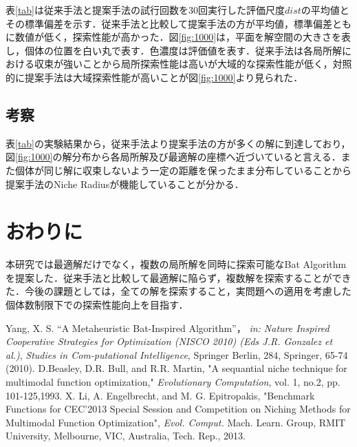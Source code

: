 \documentclass[twocolumn, a4paper]{UECIEresume}
\begin{document}
表\ref{tab}は従来手法と提案手法の試行回数を30回実行した評価尺度$dist$の平均値とその標準偏差を示す．従来手法と比較して提案手法の方が平均値，標準偏差ともに数値が低く，探索性能が高かった．図\ref{fig:1000}は，平面を解空間の大きさを表し，個体の位置を白い丸で表す．色濃度は評価値を表す．従来手法は各局所解における収束が強いことから局所探索性能は高いが大域的な探索性能が低く，対照的に提案手法は大域探索性能が高いことが図\ref{fig:1000}より見られた．

\subsection{考察}
表\ref{tab}の実験結果から，従来手法より提案手法の方が多くの解に到達しており，図\ref{fig:1000}の解分布から各局所解及び最適解の座標へ近づいていると言える．また個体が同じ解に収束しないよう一定の距離を保ったまま分布していることから提案手法のNiche Radiusが機能していることが分かる．
\section{おわりに}
本研究では最適解だけでなく，複数の局所解を同時に探索可能なBat Algorithmを提案した．従来手法と比較して最適解に陥らず，複数解を探索することができた．今後の課題としては，全ての解を探索すること，実問題への適用を考慮した個体数制限下での探索性能向上を目指す．
{\small
\begin{thebibliography}{*}
 Yang, X. S. “A Metaheuristic Bat-Inspired Algorithm”， {\it in: Nature Inspired Cooperative Strategies for Optimization (NISCO 2010) (Eds J.R. Gonzalez et al.)}, {\it Studies in Com-putational Intelligence}, Springer Berlin, 284, Springer, 65-74 (2010).
 D.Beasley, D.R. Bull, and R.R. Martin, "A sequantial niche technique for multimodal function optimization," {\it Evolutionary Computation}, vol. 1, no.2, pp. 101-125,1993.
 X. Li, A. Engelbrecht, and M. G. Epitropakis, "Benchmark Functions for CEC'2013 Special Session and Competition on Niching Methods for Multimodal Function Optimization", {\it Evol. Comput.} Mach. Learn. Group, RMIT University, Melbourne, VIC, Australia, Tech. Rep., 2013.
\end{thebibliography}
}
\end{document}
